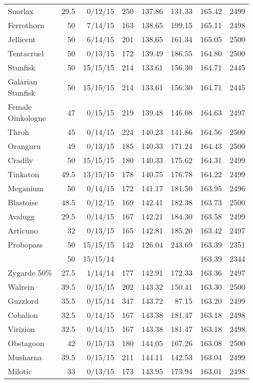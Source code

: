 \begin{longtable}{lrrrrrrr}
Snorlax & 29.5 & 0/12/15 & 250 & 137.86 & 131.33 & 165.42 & 2499\\
Ferrothorn & 50 & 7/14/15 & 163 & 138.65 & 199.15 & 165.11 & 2498\\
Jellicent & 50 & 6/14/15 & 201 & 138.65 & 161.34 & 165.05 & 2500\\
Tentacruel & 50 & 0/13/15 & 172 & 139.49 & 186.55 & 164.80 & 2500\\
Stunfisk & 50 & 15/15/15 & 214 & 133.61 & 156.30 & 164.71 & 2445\\
Galarian Stunfisk & 50 & 15/15/15 & 214 & 133.61 & 156.30 & 164.71 & 2445\\
Female Oinkologne & 47 & 0/15/15 & 219 & 139.48 & 146.08 & 164.63 & 2497\\
Throh & 45 & 0/14/15 & 224 & 140.23 & 141.86 & 164.56 & 2500\\
Oranguru & 49 & 0/13/15 & 185 & 140.33 & 171.24 & 164.43 & 2500\\
Cradily & 50 & 15/15/15 & 180 & 140.33 & 175.62 & 164.31 & 2499\\
Tinkaton & 49.5 & 13/15/15 & 178 & 140.75 & 176.78 & 164.22 & 2499\\
Meganium & 50 & 0/14/15 & 172 & 141.17 & 181.50 & 163.95 & 2496\\
Blastoise & 48.5 & 0/12/15 & 169 & 142.41 & 182.38 & 163.73 & 2500\\
Avalugg & 29.5 & 0/14/15 & 167 & 142.21 & 184.30 & 163.58 & 2499\\
Articuno & 32 & 0/13/15 & 165 & 142.81 & 185.20 & 163.42 & 2497\\
Probopass & 50 & 15/15/15 & 142 & 126.04 & 243.69 & 163.39 & 2351\\
 & 50 & 15/15/14 & & & & 163.39 & 2344\\
Zygarde 50\% & 27.5 & 1/14/14 & 177 & 142.91 & 172.33 & 163.36 & 2497\\
Walrein & 39.5 & 0/15/15 & 202 & 143.32 & 150.41 & 163.30 & 2500\\
Guzzlord & 35.5 & 0/15/14 & 347 & 143.72 & 87.15 & 163.20 & 2499\\
Cobalion & 32.5 & 0/14/15 & 167 & 143.38 & 181.47 & 163.18 & 2498\\
Virizion & 32.5 & 0/14/15 & 167 & 143.38 & 181.47 & 163.18 & 2498\\
Obstagoon & 42 & 0/15/13 & 180 & 144.05 & 167.26 & 163.08 & 2500\\
Musharna & 39.5 & 0/15/15 & 211 & 144.11 & 142.53 & 163.04 & 2499\\
Milotic & 33 & 0/13/15 & 173 & 143.95 & 173.94 & 163.01 & 2498\\

\end{longtable}
